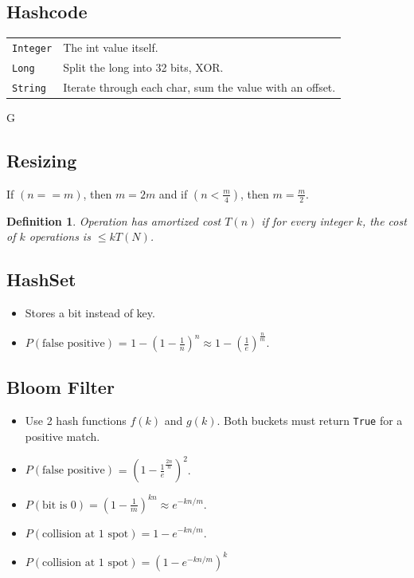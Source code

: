 \documentclass[10pt,landscape,a4paper]{article}
\newtheorem{definition}{Definition}[section]
\begin{document}
\begin{multicols*}{4}
\subsection{Hashcode}
\begin{tabular}{p{1.5cm} p{4.5cm}}
    \verb!Integer!      &   The int value itself. \\
    \verb!Long!         &   Split the long into 32 bits, XOR. \\
    \verb!String!       &   Iterate through each char, sum the value with an offset. \\
\end{tabular}

G\subsection{Resizing}
If $(n == m)$, then $m = 2m$ and if $(n < \frac{m}{4})$, then $m = \frac{m}{2}$. \\
\begin{definition}
    Operation has amortized cost $T(n)$ if for every integer $k$, the cost of $k$ operations is $\le k T(N)$.
\end{definition}

\subsection{HashSet}
\begin{itemize}
    \item Stores a bit instead of key.
    \item $P(\text{false positive})$ = $1 - (1-\frac{1}{n})^n \approx 1 - (\frac{1}{e})^{\frac{n}{m}}$.
\end{itemize}

\subsection{Bloom Filter}
\begin{itemize}
    \item Use 2 hash functions $f(k)$ and $g(k)$. Both buckets must return \texttt{True} for a positive match.
    \item $P(\text{false positive})$ = $(1 - \frac{1}{e}^{\frac{2n}{n}})^2$.
    \item $P(\text{bit is 0}) = (1 - \frac{1}{m})^{kn} \approx e^{-kn/m}$.
    \item $P(\text{collision at 1 spot}) = 1 - e^{-kn/m}$.
    \item $P(\text{collision at 1 spot}) = (1 - e^{-kn/m})^k$


\end{itemize}
\end{multicols*}
\end{document}
